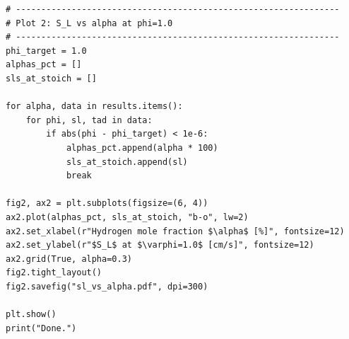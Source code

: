 \documentclass[12pt,a4paper]{article}
\begin{document}
\begin{lstlisting}[style=pythonstyle, caption={Python script for laminar burning velocity sweep using Cantera FreeFlame.}, label={lst:code}]
# ----------------------------------------------------------------
# Plot 2: S_L vs alpha at phi=1.0
# ----------------------------------------------------------------
phi_target = 1.0
alphas_pct = []
sls_at_stoich = []

for alpha, data in results.items():
    for phi, sl, tad in data:
        if abs(phi - phi_target) < 1e-6:
            alphas_pct.append(alpha * 100)
            sls_at_stoich.append(sl)
            break

fig2, ax2 = plt.subplots(figsize=(6, 4))
ax2.plot(alphas_pct, sls_at_stoich, "b-o", lw=2)
ax2.set_xlabel(r"Hydrogen mole fraction $\alpha$ [%]", fontsize=12)
ax2.set_ylabel(r"$S_L$ at $\varphi=1.0$ [cm/s]", fontsize=12)
ax2.grid(True, alpha=0.3)
fig2.tight_layout()
fig2.savefig("sl_vs_alpha.pdf", dpi=300)

plt.show()
print("Done.")
\end{lstlisting}
\end{document}
